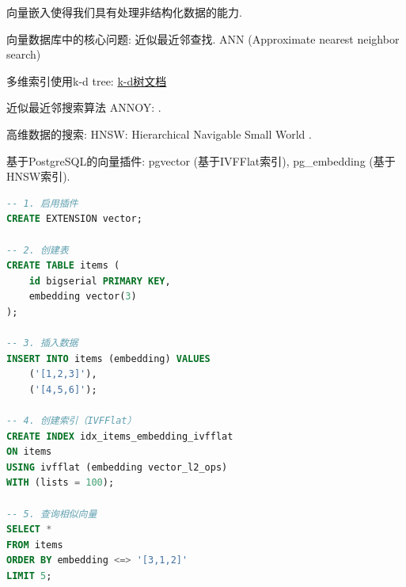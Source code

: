 向量嵌入使得我们具有处理非结构化数据的能力.

向量数据库中的核心问题: 近似最近邻查找. ANN (Approximate nearest neighbor search)

多维索引使用k-d tree: \href{https://oi-wiki.org/ds/kdt/}{k-d树文档}

近似最近邻搜索算法 ANNOY: \cite{liApproximateNearestNeighbor2016}.

高维数据的搜索: HNSW: Hierarchical Navigable Small World \cite{malkovEfficientRobustApproximate2018}.

基于PostgreSQL的向量插件: pgvector (基于IVFFlat索引), pg\_embedding (基于HNSW索引).
\begin{lstlisting}[language=SQL]
-- 1. 启用插件
CREATE EXTENSION vector;

-- 2. 创建表
CREATE TABLE items (
    id bigserial PRIMARY KEY,
    embedding vector(3)
);

-- 3. 插入数据
INSERT INTO items (embedding) VALUES
    ('[1,2,3]'),
    ('[4,5,6]');

-- 4. 创建索引（IVFFlat）
CREATE INDEX idx_items_embedding_ivfflat 
ON items 
USING ivfflat (embedding vector_l2_ops) 
WITH (lists = 100);

-- 5. 查询相似向量
SELECT * 
FROM items 
ORDER BY embedding <=> '[3,1,2]' 
LIMIT 5;
\end{lstlisting}